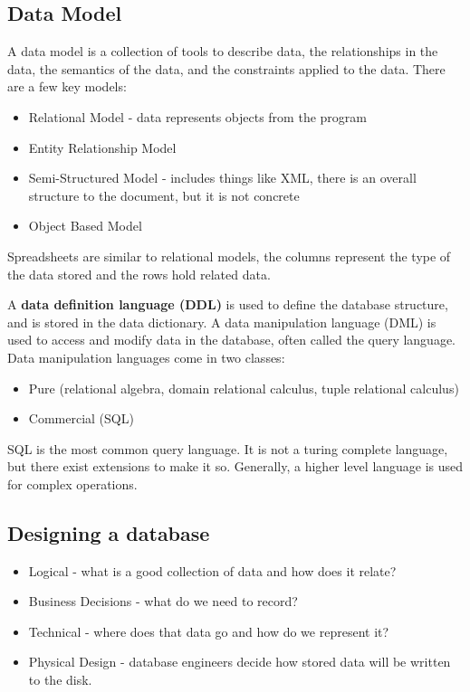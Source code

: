 \documentclass{math}
\begin{document}
\subsection*{Data Model}
A data model is a collection of tools to describe data, the relationships in the
data, the semantics of the data, and the constraints applied to the data. There
are a few key models:
\begin{itemize}
  \item Relational Model - data represents objects from the program
  \item Entity Relationship Model
  \item Semi-Structured Model - includes things like XML, there is an overall
    structure to the document, but it is not concrete
  \item Object Based Model
\end{itemize}
Spreadsheets are similar to relational models, the columns represent the type
of the data stored and the rows hold related data. \par
A \textbf{data definition language (DDL)} is used to define the database
structure, and is stored in the data dictionary. A data manipulation language
(DML) is used to access and modify data in the database, often called the query
language. Data manipulation languages come in two classes:
\begin{itemize}
  \item Pure (relational algebra, domain relational calculus, tuple relational
    calculus)
  \item Commercial (SQL)
\end{itemize}
SQL is the most common query language. It is not a turing complete language, but
there exist extensions to make it so. Generally, a higher level language is used
for complex operations.

\subsection*{Designing a database}
\begin{itemize}
  \item Logical - what is a good collection of data and how does it relate?
  \item Business Decisions - what do we need to record?
  \item Technical - where does that data go and how do we represent it?
  \item Physical Design - database engineers decide how stored data will be
    written to the disk.
\end{itemize}
\end{document}
